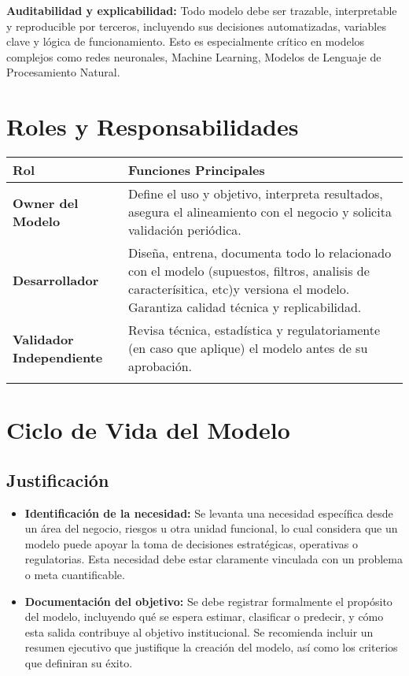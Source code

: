 \documentclass[11pt,oneside]{article}%
\begin{document}
\textbf{Auditabilidad y explicabilidad:} Todo modelo debe ser trazable, interpretable y reproducible por terceros, incluyendo sus decisiones automatizadas, variables clave y lógica de funcionamiento. Esto es especialmente crítico en modelos complejos como redes neuronales, Machine Learning, Modelos de Lenguaje de Procesamiento Natural. 

\section{Roles y Responsabilidades}

\begin{longtable}{>{\bfseries}p{5cm}  p{10cm}}
\toprule
\rowcolor{ficoblue}
\color{white}\textbf{Rol}  & \color{white}\textbf{Funciones Principales} \\
 \midrule
Owner del Modelo           & Define el uso y objetivo, interpreta resultados, asegura el alineamiento con el negocio y solicita validación periódica. \\
\addlinespace
Desarrollador                  & Diseña, entrena, documenta todo lo relacionado con el modelo (supuestos, filtros, analisis de caracterísitica, etc)y versiona el modelo. Garantiza calidad técnica y replicabilidad.\\
\addlinespace
Validador Independiente  & Revisa técnica, estadística y regulatoriamente (en caso que aplique) el modelo antes de su aprobación. \\ 
\addlinespace
\bottomrule
\end{longtable}
\section{Ciclo de Vida del Modelo}

\subsection{Justificación}
\begin{itemize}
\item \textbf{Identificación de la necesidad:} Se levanta una necesidad específica desde un área del negocio, riesgos u otra unidad funcional, lo cual considera que un modelo puede apoyar la toma de decisiones estratégicas, operativas o regulatorias. Esta necesidad debe estar claramente vinculada con un problema o meta cuantificable. 
\item \textbf{Documentación del objetivo:} Se debe registrar formalmente el propósito del modelo, incluyendo qué se espera estimar, clasificar o predecir, y cómo esta salida contribuye al objetivo institucional. Se recomienda incluir un resumen ejecutivo que justifique la creación del modelo, así como los criterios que definiran su éxito. 
\end{itemize}
\end{document}

